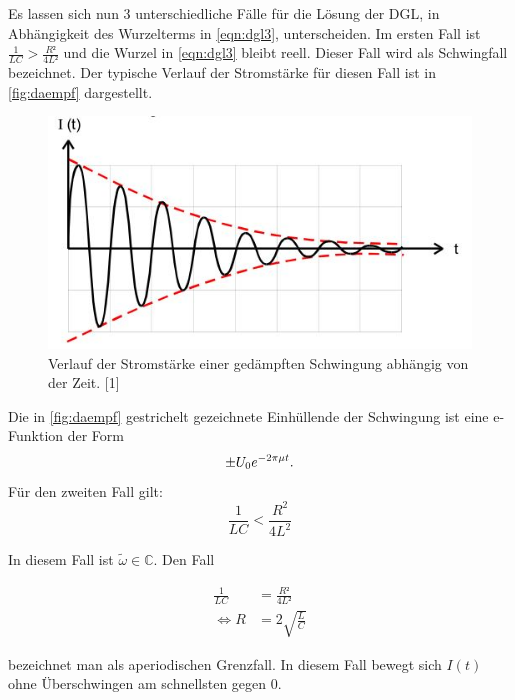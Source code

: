 \documentclass[
  bibliography=totoc,     %
  captions=tableheading,  %
  titlepage=firstiscover, %
]{scrartcl}
\begin{document}
  \noindent Es lassen sich nun 3 unterschiedliche Fälle für die Lösung der DGL, in Abhängigkeit des Wurzelterms in \autoref{eqn:dgl3}, unterscheiden. 
  Im ersten Fall ist $\frac{1}{LC} > \frac{R²}{4L²}$ und die Wurzel in \autoref{eqn:dgl3} bleibt reell. Dieser Fall wird als Schwingfall bezeichnet. Der typische Verlauf der Stromstärke für diesen Fall ist in \autoref{fig:daempf} dargestellt.
  \begin{figure}[h]
      \centering
      \includegraphics{daempf.jpg}
      \caption{Verlauf der Stromstärke einer gedämpften Schwingung abhängig von der Zeit. [1]}
      \label{fig:daempf}
    \end{figure}
  \noindent
  Die in \autoref{fig:daempf} gestrichelt gezeichnete Einhüllende der Schwingung ist eine e-Funktion der Form
  \begin{equation*}
      \pm U_0 e^{-2\pi\mu t} \\ \text{.}
      \label{eqn:einh}
  \end{equation*}
  \noindent
  Für den zweiten Fall gilt:
  \begin{equation}
      \frac{1}{LC} < \frac{R^2}{4L^2} 
  \end{equation}

  \noindent In diesem Fall ist $\tilde{\omega} \in \mathbb{C}$.
  Den Fall

  \begin{align*}
  \frac{1}{LC} &= \frac{R²}{4L²}\\
  \iff R &= 2\sqrt{\frac{L}{C}}
  \end{align*}

  \noindent bezeichnet man als aperiodischen Grenzfall. In diesem Fall bewegt sich $I(t)$ ohne 
  Überschwingen am schnellsten gegen 0. 
\end{document}
